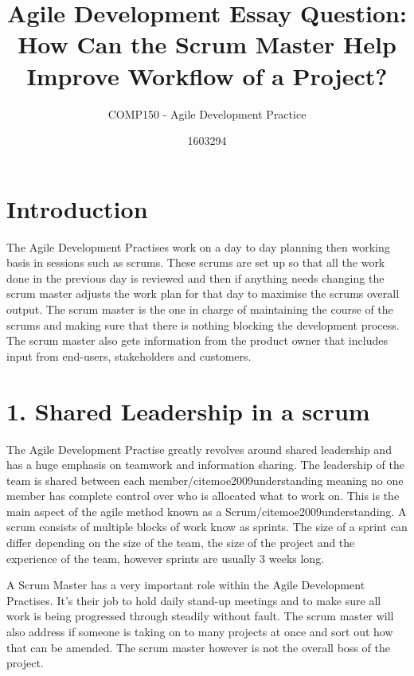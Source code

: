 \documentclass{scrartcl}
\title{Agile Development Essay Question: How Can the Scrum Master Help Improve Workflow of a Project?}
\subtitle{COMP150 - Agile Development Practice}
\author{1603294}
\begin{document}
\maketitle


\section{Introduction}

The Agile Development Practises work on a day to day planning then working basis in sessions such as scrums. These scrums are set up so that all the work done in the previous day is reviewed and then if anything needs changing the scrum master adjusts the work plan for that day to maximise the scrums overall output. The scrum master is the one in charge of maintaining the course of the scrums and making sure that there is nothing blocking the development process. The scrum master also gets information from the product owner that includes input from end-users, stakeholders and customers.

\section{1. Shared Leadership in a scrum}

The Agile Development Practise greatly revolves around shared leadership and has a huge emphasis on teamwork and information sharing. The leadership of the team is shared between each member/cite{moe2009understanding} meaning no one member has complete control over who is allocated what to work on. This is the main aspect of the agile method known as a Scrum/cite{moe2009understanding}. A scrum consists of multiple blocks of work know as sprints. The size of a sprint can differ depending on the size of the team, the size of the project and the experience of the team, however sprints are usually 3 weeks long.

A Scrum Master has a very important role within the Agile Development Practises. It's their job to hold daily stand-up meetings and to make sure all work is being progressed through steadily without fault. The scrum master will also address if someone is taking on to many projects at once and sort out how that can be amended. The scrum master however is not the overall boss of the project.
\end{document}
